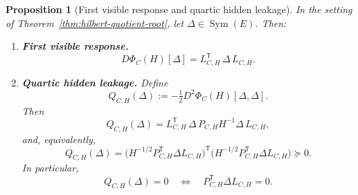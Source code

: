 \documentclass[11pt,a4paper]{article}
\numberwithin{equation}{section}
\DeclareMathOperator{\Sym}{Sym}
\theoremstyle{thmcompact}
\newtheorem{proposition}[theorem]{Proposition}
\theoremstyle{remark}
\begin{document}
\begin{proposition}[First visible response and quartic hidden leakage]\label{prop:hilbert-quotient-calculus}
In the setting of Theorem~\ref{thm:hilbert-quotient-root}, let $\Delta \in \Sym(E)$. Then:
\begin{enumerate}[label=\textup{(\roman*)}]
\item \textbf{First visible response.}
\begin{equation}\label{eq:hilbert-quotient-first-derivative}
D\Phi_C(H)[\Delta]=L_{C,H}^{\mathsf T}\,\Delta\,L_{C,H}.
\end{equation}

\item \textbf{Quartic hidden leakage.} Define
\begin{equation}\label{eq:hilbert-quotient-q}
Q_{C,H}(\Delta):=-\tfrac12 D^2\Phi_C(H)[\Delta,\Delta].
\end{equation}
Then
\begin{equation}\label{eq:hilbert-quotient-q-hidden}
Q_{C,H}(\Delta)=L_{C,H}^{\mathsf T}\,\Delta\,P_{C,H}H^{-1}\Delta\,L_{C,H},
\end{equation}
and, equivalently,
\begin{equation}\label{eq:hilbert-quotient-q-gram}
Q_{C,H}(\Delta)=\bigl(H^{-1/2}P_{C,H}^{\mathsf T}\Delta L_{C,H}\bigr)^{\mathsf T}\bigl(H^{-1/2}P_{C,H}^{\mathsf T}\Delta L_{C,H}\bigr)\succeq 0.
\end{equation}
In particular,
\begin{equation}\label{eq:hilbert-quotient-q-zero}
Q_{C,H}(\Delta)=0 \quad\Longleftrightarrow\quad P_{C,H}^{\mathsf T}\Delta L_{C,H}=0.
\end{equation}
\end{enumerate}
\end{proposition}
\end{document}
